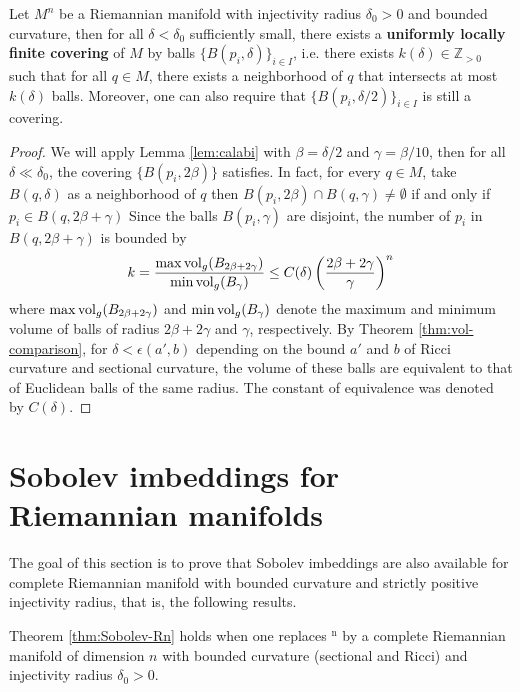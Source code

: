 \begin{lemma}
\label{lem:uni-loc-finite-cover}
Let \(M^n\) be a Riemannian manifold with injectivity radius \(\delta_0>0\) and
bounded curvature, then for all \(\delta <\delta_0\) sufficiently small, there exists a \textbf{uniformly locally
finite covering} of \(M\) by balls \(\{B(p_i,\delta)\}_{i\in I}\), i.e. there exists
\(k(\delta)\in \mathbb{Z}_{>0}\) such that for all \(q\in M\), there exists a
neighborhood of \(q\) that intersects at most \(k(\delta)\) balls. Moreover, one can
also require that \(\{B(p_i,\delta/2)\}_{i\in I}\) is still a covering.  
\end{lemma}

\begin{proof}
We will apply Lemma \ref{lem:calabi} with \(\beta = \delta/2\) and
\(\gamma = \beta/10\), then for all \(\delta \ll \delta_0\), the covering
\(\{B(p_i, 2\beta) \}\) satisfies. In fact, for every \(q\in M\), take
\(B(q,\delta)\) as a neighborhood of \(q\) then
\(B(p_i,2\beta)\cap B(q,\gamma)\ne \emptyset\) if and only if
\(p_i\in B(q,2\beta + \gamma)\) Since the balls \(B(p_i,\gamma)\) are disjoint, the
number of \(p_i\) in \(B(q,2\beta +\gamma)\) is bounded by
\[
k = \frac{\max \mathop{\rm vol}\nolimits_g (B_{2\beta+2\gamma})}{\min\mathop{\rm vol}\nolimits_g (B_\gamma)} \leq C(\delta)\left(\frac{2\beta+2\gamma}{\gamma}\right)^n
\]
where \(\max \mathop{\rm vol}\nolimits_g (B_{2\beta+2\gamma})\) and \(\min\mathop{\rm vol}\nolimits_g (B_\gamma)\) denote the
maximum and minimum volume of balls of radius \(2\beta + 2\gamma\) and \(\gamma\),
respectively. By Theorem \ref{thm:vol-comparison}, for \(\delta < \epsilon(a',b)\) depending on
the bound \(a'\) and \(b\) of Ricci curvature and sectional curvature, the volume of
these balls are equivalent to that of Euclidean balls of the same radius. The constant of
equivalence was denoted by \(C(\delta)\).
\end{proof}


\section{Sobolev imbeddings for Riemannian manifolds}
\label{sec:org78dcfd1}

The goal of this section is to prove that Sobolev imbeddings are also available for complete Riemannian manifold
with bounded curvature and strictly positive injectivity radius, that is, the following results.

\begin{theorem}
\label{thm:sobolev-imbedding}
Theorem \ref{thm:Sobolev-Rn} holds when one replaces \(^{\text{n}}\) by a complete Riemannian
manifold of dimension \(n\) with bounded curvature (sectional and Ricci) and injectivity radius \(\delta_0 >0\).
\end{theorem}

